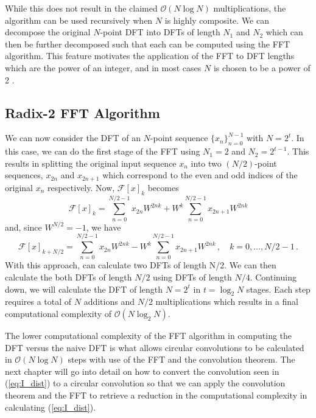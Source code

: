 \documentclass[12pt]{CSUNthesis}
\def\calF{\mathcal{F}}
\begin{document}
While this does not result in the claimed $\mathcal{O}(N \log N)$ multiplications, the algorithm can be used recursively when $N$ is highly composite. We can decompose the original $N$-point DFT into DFTs of length $N_1$ and $N_2$ which can then be further decomposed such that each can be computed using the FFT algorithm. This feature motivates the application of the FFT to DFT lengths which are the power of an integer, and in most cases $N$ is chosen to be a power of 2 \cite{Nussbaumer1982}.

\subsection{Radix-2 FFT Algorithm}
We can now consider the DFT of an $N$-point sequence $\{x_n\}_{n=0}^{N-1}$ with $N=2^t$. In this case, we can do the first stage of the FFT using $N_1 = 2$ and $N_2 = 2^{t-1}$. This results in splitting the original input sequence $x_n$ into two $(N/2)$-point sequences, $x_{2n}$ and $x_{2n+1}$ which correspond to the even and odd indices of the original $x_n$ respectively. Now, $\calF[x]_k$ becomes
\begin{equation}
\calF[x]_k = \sum_{n=0}^{N/2-1} x_{2n}W^{2nk} + W^k \sum_{n=0}^{N/2-1}x_{2n+1}W^{2nk}
\end{equation}
and, since $W^{N/2}=-1$, we have
\begin{equation}
\calF[x]_{k+N/2} = \sum_{n=0}^{N/2-1} x_{2n}W^{2nk} - W^k \sum_{n=0}^{N/2-1}x_{2n+1}W^{2nk}\, , \quad k=0,\dots,N/2-1\, .
\end{equation}
With this approach, can calculate two DFTs of length N/2. We can then calculate the both DFTs of length $N/2$ using DFTs of length $N/4$. Continuing down, we will calculate the DFT of length $N=2^t$ in $t=\log_2 N$ stages. Each step requires a total of $N$ additions and $N/2$ multiplications which results in a final computational complexity of $\mathcal{O}(N\log_2 N)$. 

The lower computational complexity of the FFT algorithm in computing the DFT versus the naive DFT is what allows circular convolutions to be calculated in $\mathcal{O}(N \log N)$ steps with use of the FFT and the convolution theorem. The next chapter will go into detail on how to convert the convolution seen in (\ref{eq:I_dist}) to a circular convolution so that we can apply the convolution theorem and the FFT to retrieve a reduction in the computational complexity in calculating (\ref{eq:I_dist}).
\end{document}
